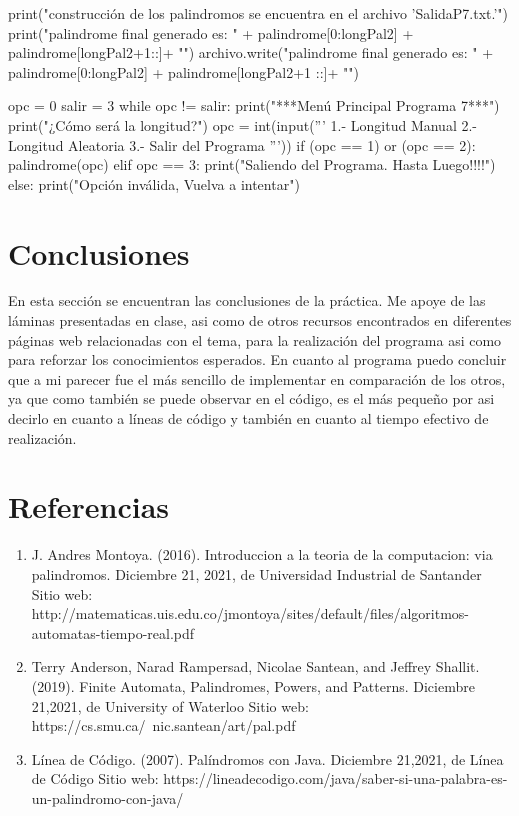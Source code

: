 \documentclass{article}
\begin{document}
\begin{python}
			print("\nLa construcción de los palindromos se encuentra en el archivo 'SalidaP7.txt.'")
			print("\nEl palindrome final generado es: " + palindrome[0:longPal2] + palindrome[longPal2+1::]+ "\n")  
			archivo.write("\nEl palindrome final generado es: " + palindrome[0:longPal2] + palindrome[longPal2+1  ::]+ "\n")         
		
		opc = 0
		salir = 3
		while opc != salir:
			print("***Menú Principal Programa 7***")    
			print("¿Cómo será la longitud?")
			opc = int(input('''
			1.- Longitud Manual
			2.- Longitud Aleatoria
			3.- Salir del Programa    
			'''))   
			if (opc == 1) or (opc == 2):
				palindrome(opc)    
			elif opc == 3:
				print("Saliendo del Programa. Hasta Luego!!!!")    
			else:
				print("Opción inválida, Vuelva a intentar")		
	\end{python}

	\section*{Conclusiones}
	En esta sección se encuentran las conclusiones de la práctica.
	Me apoye de las láminas presentadas en clase, asi como de otros recursos encontrados en diferentes páginas web relacionadas con el tema, para la realización del programa asi como para reforzar los conocimientos esperados. 
	En cuanto al programa puedo concluir que a mi parecer fue el más sencillo de implementar en comparación de los otros, ya que como también se puede observar en el código, es el más pequeño por asi decirlo en cuanto a líneas de código y también en cuanto al tiempo efectivo de realización.
	
	\section*{Referencias}
	\begin{enumerate}
		\item J. Andres Montoya. (2016). Introduccion a la teoria de la computacion: via palindromos. Diciembre 21, 2021, de Universidad Industrial de Santander Sitio web: http://matematicas.uis.edu.co/jmontoya/sites/default/files/algoritmos-automatas-tiempo-real.pdf
		\item Terry Anderson, Narad Rampersad, Nicolae Santean, and Jeffrey Shallit. (2019). Finite Automata, Palindromes, Powers, and Patterns. Diciembre 21,2021, de University of Waterloo Sitio web: https://cs.smu.ca/~nic.santean/art/pal.pdf
		\item Línea de Código. (2007). Palíndromos con Java. Diciembre 21,2021, de Línea de Código Sitio web: https://lineadecodigo.com/java/saber-si-una-palabra-es-un-palindromo-con-java/
		
	\end{enumerate}
	

	
\end{document}
